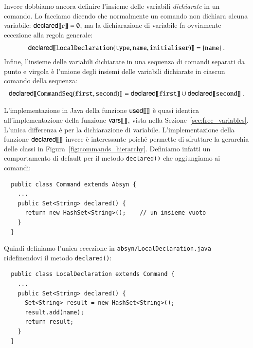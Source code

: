 Invece dobbiamo ancora definire l'insieme delle variabili
\emph{dichiarate} in un comando. Lo facciamo dicendo che normalmente un
comando non dichiara alcuna variabile:
%
$
  {\mathsf{declared}[\![{\mathit{c}}]\!]}=\emptyset
$,
%
ma la dichiarazione di variabile fa ovviamente eccezione alla regola
generale:
%
\[
  {\mathsf{declared}[\![{\mathtt{LocalDeclaration(type,name,initialiser)}}]\!]}
    =\{\mathtt{name}\}~.
\]
%
Infine, l'insieme delle variabili dichiarate in una sequenza di comandi
separati da punto e virgola \`e l'unione degli insiemi delle variabili
dichiarate in ciascun comando della sequenza:
%
\[
  {\mathsf{declared}[\![{\mathtt{CommandSeq(first,second)}}]\!]}={\mathsf{declared}[\![{\mathtt{first}}]\!]}
    \cup{\mathsf{declared}[\![{\mathtt{second}}]\!]}~.
\]

L'implementazione in Java della funzione ${\mathsf{used}[\![{}]\!]}$ \`e quasi identica
all'implementazione della funzione ${\mathsf{vars}[\![{}]\!]}$, vista nella
Sezione~\ref{sec:free_variables}. L'unica differenza \`e per la dichiarazione
di variabile. L'implementazione della funzione ${\mathsf{declared}[\![{}]\!]}$ invece
\`e interessante poich\'e permette di sfruttare la gerarchia delle
classi in Figura~\ref{fig:commands_hierarchy}. Definiamo infatti un
comportamento di default per il metodo \texttt{declared()} che aggiungiamo
ai comandi:
%
\begin{verbatim}
  public class Command extends Absyn {
    ...
    public Set<String> declared() {
      return new HashSet<String>();    // un insieme vuoto
    }
  }
\end{verbatim}
%
Quindi definiamo l'unica eccezione in \texttt{absyn/LocalDeclaration.java}
ridefinendovi il metodo \texttt{declared()}:
%
\begin{verbatim}
  public class LocalDeclaration extends Command {
    ...
    public Set<String> declared() {
      Set<String> result = new HashSet<String>();
      result.add(name);
      return result;
    }
  }
\end{verbatim}
%
